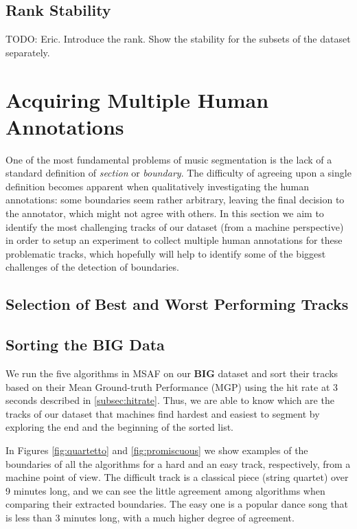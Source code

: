 \documentclass{article}
\begin{document}
\subsection{Rank Stability}

TODO: Eric. Introduce the rank. Show the stability for the subsets of the dataset separately.

\section{Acquiring Multiple Human Annotations}

One of the most fundamental problems of music segmentation is the lack of a standard definition of \textit{section} or \textit{boundary}. 
The difficulty of agreeing upon a single definition becomes apparent when qualitatively investigating the human annotations: some boundaries seem rather arbitrary, leaving the final decision to the annotator, which might not agree with others.
In this section we aim to identify the most challenging tracks of our dataset (from a machine perspective) in order to setup an experiment to collect multiple human annotations for these problematic tracks, which hopefully will help to identify some of the biggest challenges of the detection of boundaries.

\subsection{Selection of Best and Worst Performing Tracks}\label{sub:hard-easy}
\subsection{Sorting the \textbf{BIG} Data}\label{sub:hard-easy}

We run the five algorithms in MSAF on our \textbf{BIG} dataset and sort their tracks based on their Mean Ground-truth Performance (MGP) using the hit rate at 3 seconds described in \ref{subsec:hitrate}.
Thus, we are able to know which are the tracks of our dataset that machines find hardest and easiest to segment by exploring the end and the beginning of the sorted list.

In Figures \ref{fig:quartetto} and \ref{fig:promiscuous} we show examples of the boundaries of all the algorithms for a hard and an easy track, respectively, from a machine point of view.
The difficult track is a classical piece (string quartet) over 9 minutes long, and we can see the little agreement among algorithms when comparing their extracted boundaries.
The easy one is a popular dance song that is less than 3 minutes long, with a much higher degree of agreement.
\end{document}
